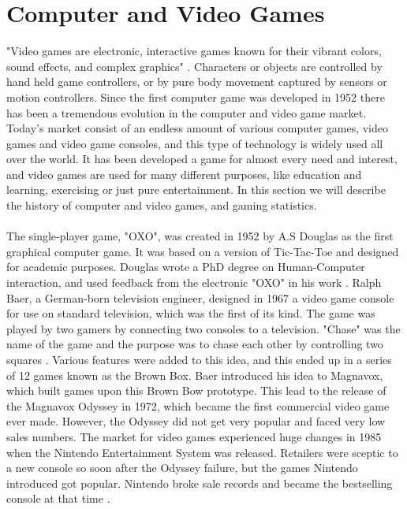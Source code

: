 \section{Computer and Video Games}
"Video games are electronic, interactive games known for their vibrant colors, sound effects, and complex graphics" \cite{videogamedef}. Characters or objects are controlled by hand held game controllers, or by pure body movement captured by sensors or motion controllers. Since the first computer game was developed in 1952 there has been a tremendous evolution in the computer and video game market. Today's market consist of an endless amount of various computer games, video games and video game consoles, and this type of technology is widely used all over the world. It has been developed a game for almost every need and interest, and video games are used for many different purposes, like education and learning, exercising or just pure entertainment. In this section we will describe the history of computer and video games, and gaming statistics. \\ \\
The single-player game, "OXO", was created in 1952 by A.S Douglas as the first graphical computer game. It was based on a version of Tic-Tac-Toe and designed for academic purposes.  Douglas wrote a PhD degree on Human-Computer interaction, and used feedback from the electronic "OXO" in his work \cite{abouthiginbotham}. Ralph Baer, a German-born television engineer, designed in 1967 a video game console for use on standard television, which was the first of its kind. The game was played by two gamers by connecting two consoles to a television. "Chase" was the name of the game and the purpose was to chase each other by controlling two squares \cite{videogameHistory}. Various features were added to this idea, and this ended up in a series of 12 games known as the Brown Box. Baer introduced his idea to Magnavox, which built games upon this Brown Bow prototype. This lead to the release of the Magnavox Odyssey in 1972, which became the first commercial video game ever made. However, the Odyssey did not get very popular and faced very low sales numbers. The market for video games experienced huge changes in 1985 when the Nintendo Entertainment System was released. Retailers were sceptic to a new console so soon after the Odyssey failure, but the games Nintendo introduced got popular. Nintendo broke sale records and became the bestselling console at that time \cite{consoleHistory}. \\ \\
